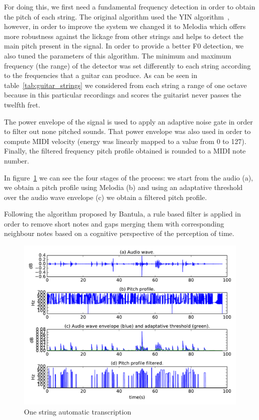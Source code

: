 For doing this, we first need a fundamental frequency detection in order to obtain the pitch of each string. The original algorithm used the YIN algorithm~\cite{Cheveigne2002}, however, in order to improve the system we changed it to Melodia which offers more robustness against the lickage from other strings and helps to detect the main pitch present in the signal. In order to provide a better F0 detection, we also tuned the parameters of this algorithm. The minimum and maximum frequency (the range) of the detector was set differently to each string according to the frequencies that a guitar can produce. As can be seen in table~\ref{tab:guitar_strings} we considered from each string a range of one octave because in this particular recordings and scores the guitarist never passes the twelfth fret.


The power envelope of the signal is used to apply an adaptive noise gate in order to filter out none pitched sounds. That power envelope was also used in order to compute MIDI velocity (energy was linearly mapped to a value from 0 to 127). Finally, the filtered frequency pitch profile obtained is rounded to a MIDI note number.

In figure~\ref{fig:transcription} we can see the four stages of the process: we start from the audio (a), we obtain a pitch profile using Melodia (b) and using an adaptative threshold over the audio wave envelope (c) we obtain a filtered pitch profile.

Following the algorithm proposed by Bantula, a rule based filter is applied in order to remove short notes and gaps merging them with corresponding neighbour notes based on a cognitive perspective of the perception of time.

\begin{figure}[ht!]
\caption{One string automatic transcription}
\label{fig:transcription}
\centering
\includegraphics[width=\textwidth]{Figures/transcription.pdf}
\end{figure}

